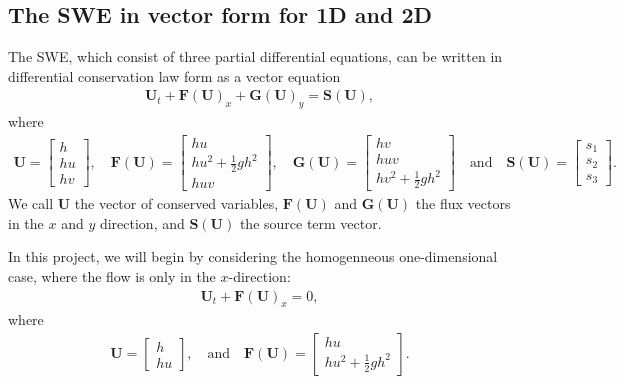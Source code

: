 \subsection{The SWE in vector form for 1D and 2D}
The SWE, which consist of three partial differential equations, can be written in differential conservation law form as a vector equation
\begin{align}
    \mathbf{U}_t + \mathbf{F(U)}_x + \mathbf{G(U)}_y = \mathbf{S(U)},
\end{align}
where 
\begin{align*}
    \mathbf{U} = \begin{bmatrix}
        h \\
        hu \\
        hv
    \end{bmatrix},
    \quad 
    \mathbf{F(U)} = \begin{bmatrix}
        hu \\
        hu^2 + \frac{1}{2}gh^2 \\
        huv
    \end{bmatrix},
    \quad
    \mathbf{G(U)} = \begin{bmatrix}
        hv \\
        huv \\
        hv^2 + \frac{1}{2}gh^2
    \end{bmatrix}
    \quad \text{and} \quad
    \mathbf{S(U)} = \begin{bmatrix}
        s_1 \\
        s_2 \\
        s_3
    \end{bmatrix}.
\end{align*}
We call $\mathbf{U}$ the vector of conserved variables, $\mathbf{F(U)}$ and $\mathbf{G(U)}$ the flux vectors in the $x$ and $y$ direction, and $\mathbf{S(U)}$ the source term vector.

In this project, we will begin by considering the homogenneous one-dimensional case, where the flow is only in the $x$-direction:
\begin{align*}
    \mathbf{U}_t + {\mathbf{F(U)}}_x = 0,
\end{align*}
where 
\begin{align*}
    \mathbf{U} = \begin{bmatrix}
        h \\
        hu
    \end{bmatrix},
    \quad
    \text{and} \quad
    \mathbf{F(U)} = \begin{bmatrix}
        hu \\
        hu^2 + \frac{1}{2}gh^2
    \end{bmatrix}.
\end{align*}




